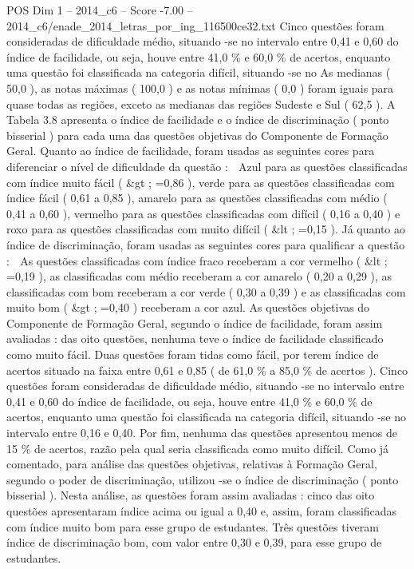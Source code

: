 \begin{textsample}{POS Dim 1 – 2014\_c6 – Score -7.00 – 2014\_c6/enade\_2014\_letras\_por\_ing\_116500ce32.txt}
Cinco questões foram consideradas de dificuldade médio, situando -se no intervalo entre 0,41 e 0,60 do índice de facilidade, ou seja, houve entre 41,0 \% e 60,0 \% de acertos, enquanto uma questão foi classificada na categoria difícil, situando -se no As medianas ( 50,0 ), as notas máximas ( 100,0 ) e as notas mínimas ( 0,0 ) foram iguais para quase todas as regiões, exceto as medianas das regiões Sudeste e Sul ( 62,5 ).
A Tabela 3.8 apresenta o índice de facilidade e o índice de discriminação ( ponto bisserial ) para cada uma das questões objetivas do Componente de Formação Geral.
Quanto ao índice de facilidade, foram usadas as seguintes cores para diferenciar o nível de dificuldade da questão :  Azul para as questões classificadas com índice muito fácil ( \&gt ; =0,86 ), verde para as questões classificadas com índice fácil ( 0,61 a 0,85 ), amarelo para as questões classificadas com médio ( 0,41 a 0,60 ), vermelho para as questões classificadas com difícil ( 0,16 a 0,40 ) e roxo para as questões classificadas com muito difícil ( \&lt ; =0,15 ).
Já quanto ao índice de discriminação, foram usadas as seguintes cores para qualificar a questão :  As questões classificadas com índice fraco receberam a cor vermelho ( \&lt ; =0,19 ), as classificadas com médio receberam a cor amarelo ( 0,20 a 0,29 ), as classificadas com bom receberam a cor verde ( 0,30 a 0,39 ) e as classificadas com muito bom ( \&gt ; =0,40 ) receberam a cor azul.
As questões objetivas do Componente de Formação Geral, segundo o índice de facilidade, foram assim avaliadas : das oito questões, nenhuma teve o índice de facilidade classificado como muito fácil.
Duas questões foram tidas como fácil, por terem índice de acertos situado na faixa entre 0,61 e 0,85 ( de 61,0 \% a 85,0 \% de acertos ).
Cinco questões foram consideradas de dificuldade médio, situando -se no intervalo entre 0,41 e 0,60 do índice de facilidade, ou seja, houve entre 41,0 \% e 60,0 \% de acertos, enquanto uma questão foi classificada na categoria difícil, situando -se no intervalo entre 0,16 e 0,40.
Por fim, nenhuma das questões apresentou menos de 15 \% de acertos, razão pela qual seria classificada como muito difícil.
Como já comentado, para análise das questões objetivas, relativas à Formação Geral, segundo o poder de discriminação, utilizou -se o índice de discriminação ( ponto bisserial ).
Nesta análise, as questões foram assim avaliadas : cinco das oito questões apresentaram índice acima ou igual a 0,40 e, assim, foram classificadas com índice muito bom para esse grupo de estudantes.
Três questões tiveram índice de discriminação bom, com valor entre 0,30 e 0,39, para esse grupo de estudantes.

\end{textsample}
